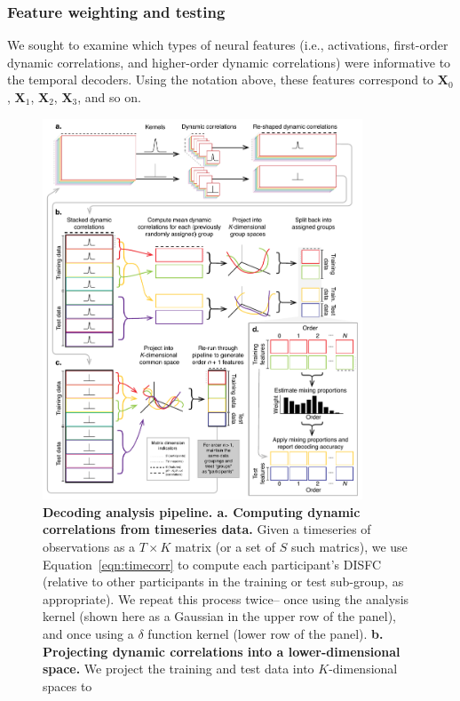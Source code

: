 \documentclass[english]{article}
\begin{document}
\subsubsection*{Feature weighting and testing}
We sought to examine which types of neural features (i.e.,
activations, first-order dynamic correlations, and higher-order
dynamic correlations) were informative to the temporal decoders.
Using the notation above, these features correspond to $\mathbf{X}_0$,
$\mathbf{X}_1$, $\mathbf{X}_2$, $\mathbf{X}_3$, and so on.

\begin{figure}[tp]
  \centering
  \includegraphics[width=0.85\textwidth]{figs/timecorr_pipeline}
  \caption{\textbf{Decoding analysis pipeline.  a. Computing dynamic
      correlations from timeseries data.}  Given a timeseries of
    observations as a $T \times K$ matrix (or a set of $S$ such
    matrics), we use Equation~\ref{eqn:timecorr} to compute each
    participant's DISFC (relative to other participants in the
    training or test sub-group, as appropriate). We repeat this
    process twice-- once using the analysis kernel (shown here as a
    Gaussian in the upper row of the panel), and once using a $\delta$
    function kernel (lower row of the panel).    \textbf{b. Projecting
      dynamic correlations into a lower-dimensional space.}  We
    project the training and test data into $K$-dimensional spaces to
}
\end{figure}
\end{document}
